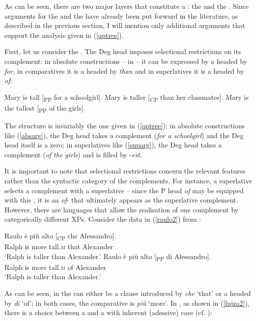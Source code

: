 As can be seen, there are two major layers that constitute a : the  and the . Since arguments for the  and the  have already been put forward in the literature, as described in the previous section, I will mention only additional arguments that support the analysis given in (\ref{qptree}).

First, let us consider the . The Deg head imposes selectional restrictions on its complement: in absolute constructions -- in  -- it can be expressed by a  headed by \textit{for}, in comparatives it is a  headed by \textit{than} and in superlatives it is a  headed by \textit{of}:

\ea \label{degarg}
\ea	Mary is tall [\textsubscript{PP} for a schoolgirl]. \label{absarg}
\ex	Mary is taller [\textsubscript{CP} than her classmates].
\ex	Mary is the tallest [\textsubscript{PP} of the girls]. \label{suparg}
\z
\z

The structure is invariably the one given in (\ref{qptree}); in absolute constructions like (\ref{absarg}), the Deg head takes a  complement (\textit{for a schoolgirl}) and the Deg head itself is a zero; in superlatives like (\ref{suparg}), the Deg head takes a  complement (\textit{of the girls}) and is filled by -\textit{est}.

It is important to note that selectional restrictions concern the relevant  features rather than the syntactic category of the complements. For instance, a superlative  selects a complement with a superlative  -- since the P head \textit{of} may be equipped with this , it is an \textit{of}- that ultimately appears as the superlative complement. However, there are languages that allow the realisation of one  complement by categorically different XPs. Consider the data in (\ref{raulo2}) from :

\ea \label{raulo2}
\ea \gll Raulo è più alto [\textsubscript{CP} che Alessandro].\\
Ralph	is more tall.\textsc{m} {} that Alexander\\
\glt `Ralph is taller than Alexander.'
\ex \gll Raulo è più alto [\textsubscript{PP} di Alessandro].\\
Ralph is more tall.\textsc{m} {} of Alexander\\
\glt `Ralph is taller than Alexander.'
\z
\z

As can be seen, in  the  can either be a clause introduced by \textit{che} `that' or a  headed by \textit{di} `of'; in both cases, the comparative  is \textit{più} `more'. In , as shown in (\ref{lujza2}), there is a choice between a  and a  with inherent (adessive) case (cf. \citealt{wunderlich2001}):

